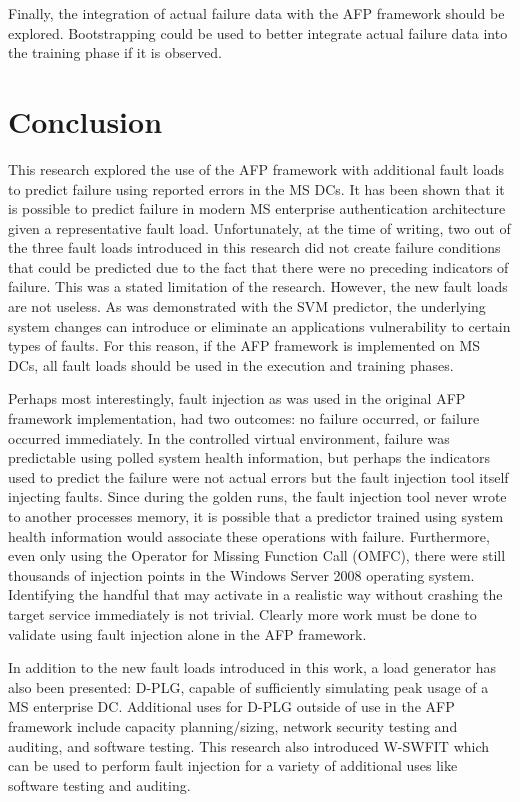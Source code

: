 Finally, the integration of actual failure data with the \ac{AFP} framework
should be explored.  Bootstrapping could be used to better integrate actual
failure data into the training phase if it is observed. 

\section{Conclusion}
This research explored the use of the \ac{AFP} framework with additional fault
loads to predict failure using reported errors in the \ac{MS} \ac{DC}s.  It has
been shown that it is possible to predict failure in modern \ac{MS} enterprise
authentication architecture given a representative fault load.  Unfortunately,
at the time of writing, two out of the three fault loads introduced in this
research did not create failure conditions that could be predicted due to the
fact that there were no preceding indicators of failure.  This was a stated
limitation of the research.  However, the new fault loads are not useless.  As
was demonstrated with the \ac{SVM} predictor, the underlying system changes can
introduce or eliminate an applications vulnerability to certain types of
faults.  For this reason, if the \ac{AFP} framework is implemented on \ac{MS}
\ac{DC}s, all fault loads should be used in the execution and training phases.

Perhaps most interestingly, fault injection as was used in the original
\ac{AFP} framework implementation, had two outcomes: no failure occurred, or
failure occurred immediately.  In the controlled virtual environment, failure
was predictable using polled system health information, but perhaps the
indicators used to predict the failure were not actual errors but the fault
injection tool itself injecting faults.  Since during the golden runs, the
fault injection tool never wrote to another processes memory, it is possible
that a predictor trained using system health information would associate these
operations with failure.  Furthermore, even only using the Operator for Missing
Function Call (OMFC), there were still thousands of injection points in the
Windows Server 2008 operating system.  Identifying the handful that may
activate in a realistic way without crashing the target service immediately is
not trivial.  Clearly more work must be done to validate using fault injection
alone in the \ac{AFP} framework.

In addition to the new fault loads introduced in this work, a load generator
has also been presented:  \ac{D-PLG}, capable of sufficiently simulating peak
usage of a \ac{MS} enterprise \ac{DC}.  Additional uses for \ac{D-PLG} outside
of use in the \ac{AFP} framework include capacity planning/sizing, network
security testing and auditing, and software testing.  This research also
introduced \ac{W-SWFIT} which can be used to perform fault injection for a
variety of additional uses like software testing and auditing.

